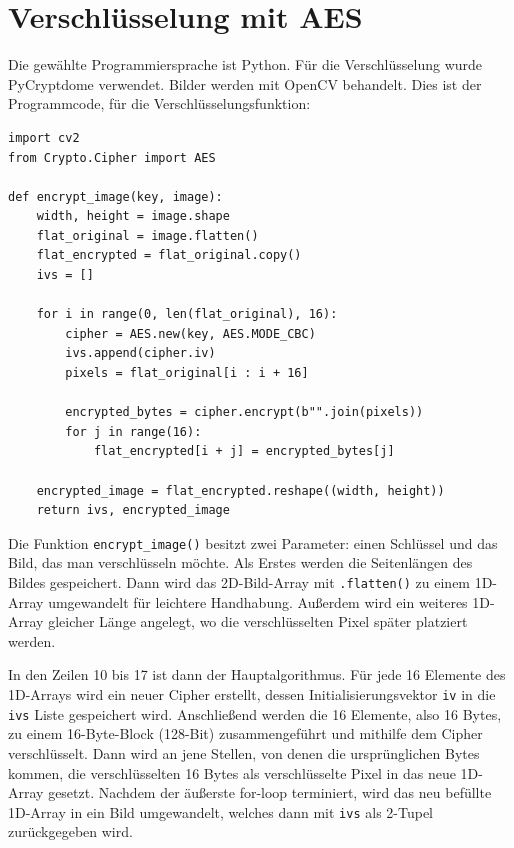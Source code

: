 \section{Verschlüsselung mit AES}
Die gewählte Programmiersprache ist Python. Für die Verschlüsselung wurde PyCryptdome verwendet.
Bilder werden mit OpenCV behandelt.
Dies ist der Programmcode, für die Verschlüsselungsfunktion:
\begin{lstlisting}
import cv2
from Crypto.Cipher import AES

def encrypt_image(key, image):
    width, height = image.shape
    flat_original = image.flatten()
    flat_encrypted = flat_original.copy()
    ivs = []

    for i in range(0, len(flat_original), 16):
        cipher = AES.new(key, AES.MODE_CBC)
        ivs.append(cipher.iv)
        pixels = flat_original[i : i + 16]

        encrypted_bytes = cipher.encrypt(b"".join(pixels))
        for j in range(16):
            flat_encrypted[i + j] = encrypted_bytes[j]

    encrypted_image = flat_encrypted.reshape((width, height))
    return ivs, encrypted_image
\end{lstlisting}
Die Funktion \lstinline{encrypt_image()} besitzt zwei Parameter: einen Schlüssel und das Bild,
das man verschlüsseln möchte. Als Erstes werden die Seitenlängen des Bildes gespeichert. Dann wird das 2D-Bild-Array
mit \lstinline{.flatten()} zu einem 1D-Array umgewandelt für leichtere Handhabung. Außerdem wird ein weiteres 1D-Array
gleicher Länge angelegt, wo die verschlüsselten Pixel später platziert werden.

In den Zeilen 10 bis 17 ist dann der Hauptalgorithmus. Für jede 16 Elemente des 1D-Arrays wird ein neuer Cipher erstellt,
dessen Initialisierungsvektor \lstinline{iv} in die \lstinline{ivs} Liste gespeichert wird. Anschließend werden die 16 Elemente,
also 16 Bytes, zu einem 16-Byte-Block (128-Bit) zusammengeführt und mithilfe dem Cipher verschlüsselt.
Dann wird an jene Stellen, von denen die ursprünglichen Bytes kommen, die verschlüsselten
16 Bytes als verschlüsselte Pixel in das neue 1D-Array gesetzt. Nachdem der äußerste for-loop terminiert, wird das neu befüllte 1D-Array in ein
Bild umgewandelt, welches dann mit \lstinline{ivs} als 2-Tupel zurückgegeben wird.

